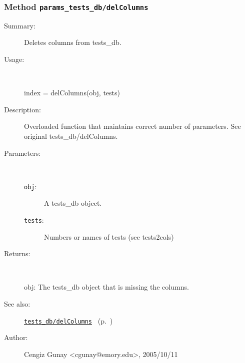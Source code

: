 \subsubsection[Method \texttt{delColumns}]{Method \texttt{params\_tests\_db/delColumns}}%
%
\label{ref_params_tests_db__delColumns}%
\hypertarget{ref_params_tests_db__delColumns}{}%
\begin{description}
\item[Summary:]Deletes columns from tests\_db.
%
\item[Usage:]~%
\begin{lyxcode}%
index = delColumns(obj, tests)
%
\end{lyxcode}%
%
\item[Description:]%
Overloaded function that maintains correct number of parameters. See
 original tests\_db/delColumns.
\item[Parameters:]~
\begin{description}%
\item[\texttt{obj}:]
 A tests\_db object.
\item[\texttt{tests}:]
 Numbers or names of tests (see tests2cols)
\end{description}%
%
\item[Returns:]~

	obj: The tests\_db object that is missing the columns.
%
%
\item[See also:]%
\hyperlink{ref_tests_db__delColumns}{\texttt{tests\_db/delColumns}}%
\ (p.~\pageref{ref_tests_db__delColumns})%
%
%
\item[Author:]%
Cengiz Gunay <cgunay@emory.edu>, 2005/10/11%
\end{description}
\methodline%
